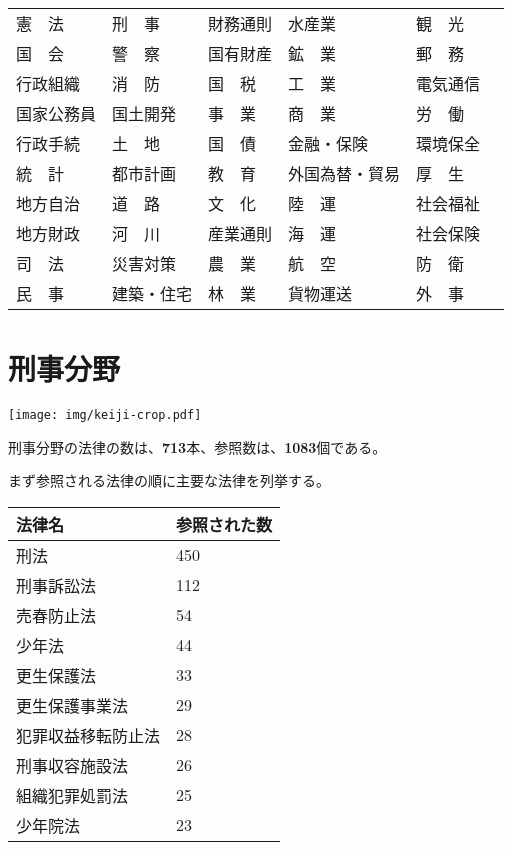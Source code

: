 \documentclass[a5j,openany,twoside]{jsbook}
\begin{document}
\begin{table}[htb]
  \begin{tabular}{|l|l|l|l|l|l|}  \hline
\cellcolor[gray]{0.85} 憲　法 & \cellcolor[gray]{0.85} 刑　事 & 財務通則 & 水産業 & 観　光\\
国　会 & 警　察 & 国有財産 & \cellcolor[gray]{0.85} 鉱　業 & 郵　務\\
行政組織 & 消　防 & 国　税 & 工　業 & 電気通信\\
国家公務員 & 国土開発 & 事　業 & 商　業 & \cellcolor[gray]{0.85} 労　働\\
行政手続 & 土　地 & \cellcolor[gray]{0.85}国　債 & 金融・保険 & 環境保全\\
統　計 & 都市計画 & \cellcolor[gray]{0.85}教　育 & 外国為替・貿易 & 厚　生\\
地方自治 & 道　路 & \cellcolor[gray]{0.85}文　化 & 陸　運 & 社会福祉\\
地方財政 & \cellcolor[gray]{0.85}河　川 & 産業通則 & 海　運 & \cellcolor[gray]{0.85} 社会保険\\
司　法 & 災害対策 & 農　業 & 航　空 & 防　衛\\
民　事 & 建築・住宅 & 林　業 & 貨物運送 & 外　事\\ \hline
  \end{tabular}
\end{table}

\section{刑事分野}

\texttt{[image: img/keiji-crop.pdf]}

刑事分野の法律の数は、\textbf{713}本、参照数は、\textbf{1083}個である。

まず参照される法律の順に主要な法律を列挙する。

\begin{table}[htb]
  \begin{tabular}{|l|l|}  \hline
法律名 & 参照された数 \\ \hline \hline
刑法 & 450 \\
刑事訴訟法 & 112 \\
売春防止法 & 54 \\
少年法 & 44 \\
更生保護法 & 33 \\
更生保護事業法 & 29 \\
犯罪収益移転防止法 & 28 \\
刑事収容施設法 & 26 \\
組織犯罪処罰法 & 25 \\
少年院法 & 23 \\ \hline
  \end{tabular}
\end{table}
\end{document}
